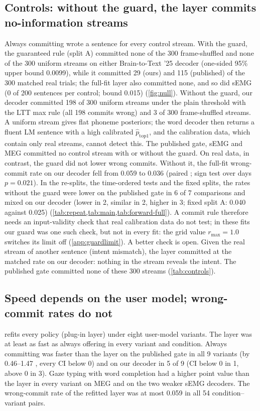 \subsection{Controls: without the guard, the layer commits no-information streams}
\label{sec:res-null}
Always committing wrote a sentence for every control stream. With the guard, the guaranteed rule (split A) committed none of the 300 frame-shuffled and none of the 300 uniform streams on either Brain-to-Text '25 decoder (one-sided 95\% upper bound 0.0099), while it committed 29 (ours) and 115 (published) of the 300 matched real trials; the full-fit layer also committed none, and so did sEMG (0 of 200 sentences per control; bound 0.015) (\cref{fig:null}). Without the guard, our decoder committed 198 of 300 uniform streams under the plain threshold with the LTT max rule (all 198 commits wrong) and 3 of 300 frame-shuffled streams. A uniform stream gives flat phoneme posteriors; the word decoder then returns a fluent LM sentence with a high calibrated $\hat p_{\mathrm{top1}}$, and the calibration data, which contain only real streams, cannot detect this. The published gate, sEMG and MEG committed no control stream with or without the guard. On real data, in contrast, the guard did not lower wrong commits. Without it, the full-fit wrong-commit rate on our decoder fell from 0.059 to 0.036 (paired ; sign test over days $p = 0.021$). In the re-splits, the time-ordered tests and the fixed splits, the rates without the guard were lower on the published gate in 6 of 7 comparisons and mixed on our decoder (lower in 2, similar in 2, higher in 3; fixed split A: 0.040 against 0.025) (\cref{tab:repeat,tab:main,tab:forward-full}). A commit rule therefore needs an input-validity check that real calibration data do not test; in these fits our guard was one such check, but not in every fit: the grid value $r_{\max} = 1.0$ switches its limit off (\cref{app:guardlimit}). A better check is open. Given the real stream of another sentence (intent mismatch), the layer committed at the matched rate on our decoder: nothing in the stream reveals the intent. The published gate committed none of these 300 streams (\cref{tab:controls}).

\subsection{Speed depends on the user model; wrong-commit rates do not}
\label{sec:res-user}
 refits every policy (plug-in layer) under eight user-model variants. The layer was at least as fast as always offering in every variant and condition. Always committing was faster than the layer on the published gate in all 9 variants (by 0.46--1.47 \ewpm{}, every CI below 0) and on our decoder in 5 of 9 (CI below 0 in 1, above 0 in 3). Gaze typing with word completion had a higher point value than the layer in every variant on MEG and on the two weaker sEMG decoders. The wrong-commit rate of the refitted layer was at most 0.059 in all 54 condition--variant pairs.

